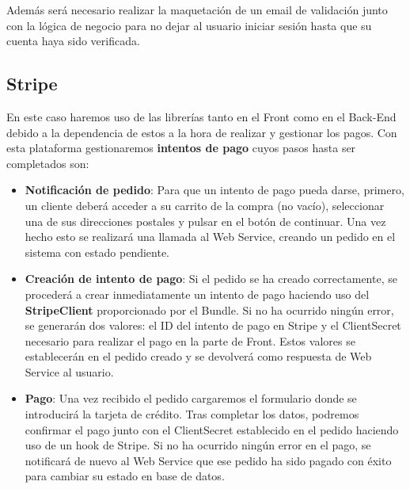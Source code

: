 Además será necesario realizar la maquetación de un email de validación junto con la lógica de negocio para no dejar al usuario iniciar sesión hasta que su cuenta haya sido verificada.

\subsection{Stripe}

En este caso haremos uso de las librerías tanto en el Front como en el Back-End debido a la dependencia de estos a la hora de realizar y gestionar los pagos. Con esta plataforma gestionaremos \textbf{intentos de pago} cuyos pasos hasta ser completados son:

\begin{itemize}
    \item \textbf{Notificación de pedido}: Para que un intento de pago pueda darse, primero, un cliente deberá acceder a su carrito de la compra (no vacío), seleccionar una de sus direcciones postales y pulsar en el botón de continuar. Una vez hecho esto se realizará una llamada al Web Service, creando un pedido en el sistema con estado pendiente.
    \item \textbf{Creación de intento de pago}: Si el pedido se ha creado correctamente, se procederá a crear inmediatamente un intento de pago haciendo uso del \textbf{StripeClient} proporcionado por el Bundle. Si no ha ocurrido ningún error, se generarán dos valores: el ID del intento de pago en Stripe y el ClientSecret necesario para realizar el pago en la parte de Front. Estos valores se establecerán en el pedido creado y se devolverá como respuesta de Web Service al usuario.
    \item \textbf{Pago}: Una vez recibido el pedido cargaremos el formulario donde se introducirá la tarjeta de crédito. Tras completar los datos, podremos confirmar el pago junto con el ClientSecret establecido en el pedido haciendo uso de un hook de Stripe. Si no ha ocurrido ningún error en el pago, se notificará de nuevo al Web Service que ese pedido ha sido pagado con éxito para cambiar su estado en base de datos.
\end{itemize}

